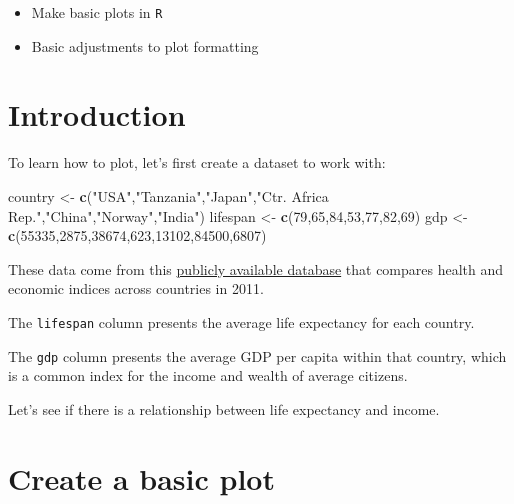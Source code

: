 \documentclass[
]{book}
\newenvironment{Shaded}{\begin{snugshade}}{\end{snugshade}}
\newcommand{\DecValTok}[1]{\textcolor[rgb]{0.00,0.00,0.81}{#1}}
\newcommand{\KeywordTok}[1]{\textcolor[rgb]{0.13,0.29,0.53}{\textbf{#1}}}
\newcommand{\NormalTok}[1]{#1}
\newcommand{\StringTok}[1]{\textcolor[rgb]{0.31,0.60,0.02}{#1}}
\providecommand{\tightlist}{%
  \setlength{\itemsep}{0pt}\setlength{\parskip}{0pt}}
\begin{document}
\begin{itemize}
\tightlist
\item
  Make basic plots in \texttt{R}
\item
  Basic adjustments to plot formatting
\end{itemize}

\hypertarget{introduction}{%
\section*{Introduction}\label{introduction}}

To learn how to plot, let's first create a dataset to work with:

\begin{Shaded}
\begin{Highlighting}[]
\NormalTok{country <-}\StringTok{ }\KeywordTok{c}\NormalTok{(}\StringTok{"USA"}\NormalTok{,}\StringTok{"Tanzania"}\NormalTok{,}\StringTok{"Japan"}\NormalTok{,}\StringTok{"Ctr. Africa Rep."}\NormalTok{,}\StringTok{"China"}\NormalTok{,}\StringTok{"Norway"}\NormalTok{,}\StringTok{"India"}\NormalTok{)}
\NormalTok{lifespan <-}\StringTok{ }\KeywordTok{c}\NormalTok{(}\DecValTok{79}\NormalTok{,}\DecValTok{65}\NormalTok{,}\DecValTok{84}\NormalTok{,}\DecValTok{53}\NormalTok{,}\DecValTok{77}\NormalTok{,}\DecValTok{82}\NormalTok{,}\DecValTok{69}\NormalTok{)}
\NormalTok{gdp <-}\StringTok{ }\KeywordTok{c}\NormalTok{(}\DecValTok{55335}\NormalTok{,}\DecValTok{2875}\NormalTok{,}\DecValTok{38674}\NormalTok{,}\DecValTok{623}\NormalTok{,}\DecValTok{13102}\NormalTok{,}\DecValTok{84500}\NormalTok{,}\DecValTok{6807}\NormalTok{)}
\end{Highlighting}
\end{Shaded}

These data come from this \href{https://datasets.iisg.amsterdam/dataset.xhtml?persistentId=hdl:10622/LKYT53}{publicly available database} that compares health and economic indices across countries in 2011.

The \texttt{lifespan} column presents the average life expectancy for each country.

The \texttt{gdp} column presents the average GDP per capita within that country, which is a common index for the income and wealth of average citizens.

Let's see if there is a relationship between life expectancy and income.

\hypertarget{create-a-basic-plot}{%
\section*{Create a basic plot}\label{create-a-basic-plot}}
\end{document}

